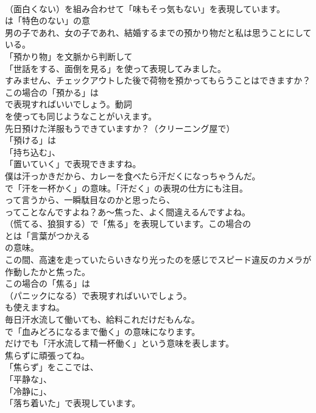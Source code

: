 \documentclass[8pt]{extreport}
\begin{document}
\begin{CJK}{UTF8}{min}
\\	（面白くない）を組み合わせて「味もそっ気もない」を表現しています。
\\	は「特色のない」の意	
\\	男の子であれ、女の子であれ、結婚するまでの預かり物だと私は思うことにしている。 
\\	「預かり物」を文脈から判断して
\\	「世話をする、面倒を見る」を使って表現してみました。	
\\	すみません、チェックアウトした後で荷物を預かってもらうことはできますか？ 
\\	この場合の「預かる」は 
\\	で表現すればいいでしょう。動詞 
\\	を使っても同じようなことがいえます。	
\\	先日預けた洋服もうできていますか？（クリーニング屋で） 
\\	「預ける」は
\\	「持ち込む」、
\\	「置いていく」で表現できますね。	
\\	僕は汗っかきだから、カレーを食べたら汗だくになっちゃうんだ。 
\\	で「汗を一杯かく」の意味。「汗だく」の表現の仕方にも注目。	
\\	って言うから、一瞬駄目なのかと思ったら、
\\	ってことなんですよね？あ～焦った、よく間違えるんですよね。 
\\	（慌てる、狼狽する）で「焦る」を表現しています。この場合の 
\\	とは「言葉がつかえる
\\	の意味。	
\\	この間、高速を走っていたらいきなり光ったのを感じでスピード違反のカメラが作動したかと焦った。 
\\	この場合の「焦る」は 
\\	（パニックになる）で表現すればいいでしょう。
\\	も使えますね。	
\\	毎日汗水流して働いても、給料これだけだもんな。 
\\	で「血みどろになるまで働く」の意味になります。
\\	だけでも「汗水流して精一杯働く」という意味を表します。	
\\	焦らずに頑張ってね。 
\\	「焦らず」をここでは、
\\	「平静な」、
\\	「冷静に」、
\\	「落ち着いた」で表現しています。	

\end{CJK}
\end{document}
